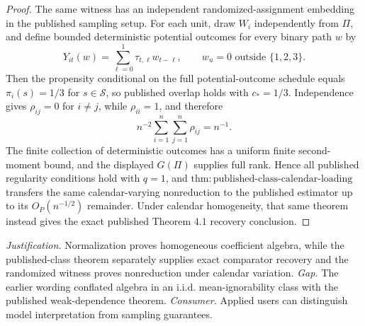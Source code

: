 \documentclass{article}
\begin{document}
\begin{proof}
The same witness has an independent randomized-assignment embedding in the published sampling setup.  For each unit, draw \(W_i\) independently from \(\Pi\), and define bounded deterministic potential outcomes for every binary path \(w\) by
\[
 Y_{it}(w)=\sum_{\ell=0}^{1}\tau_{t,\ell}w_{t-\ell},
 \qquad w_u=0\text{ outside }\{1,2,3\}.
\]
Then the propensity conditional on the full potential-outcome schedule equals \(\pi_i(s)=1/3\) for \(s\in\mathcal S\), so published overlap holds with \(c_*=1/3\).  Independence gives \(\rho_{ij}=0\) for \(i\neq j\), while \(\rho_{ii}=1\), and therefore
\[
 n^{-2}\sum_{i=1}^{n}\sum_{j=1}^{n}\rho_{ij}=n^{-1}.
\]
The finite collection of deterministic outcomes has a uniform finite second-moment bound, and the displayed \(G(\Pi)\) supplies full rank.  Hence all published regularity conditions hold with \(q=1\), and \(\mathrm{thm{:}published\text{-}class\text{-}calendar\text{-}loading}\) transfers the same calendar-varying nonreduction to the published estimator up to its \(O_P(n^{-1/2})\) remainder.  Under calendar homogeneity, that same theorem instead gives the exact published Theorem \(4.1\) recovery conclusion.
\end{proof}
\par\smallskip\noindent \textit{Justification.} Normalization proves homogeneous coefficient algebra, while the published-class theorem separately supplies exact comparator recovery and the randomized witness proves nonreduction under calendar variation. \textit{Gap.} The earlier wording conflated algebra in an i.i.d. mean-ignorability class with the published weak-dependence theorem. \textit{Consumer.} Applied users can distinguish model interpretation from sampling guarantees.
\end{document}
